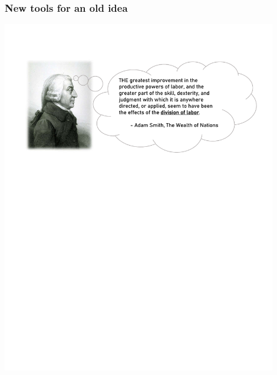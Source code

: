 \begin{frame}\frametitle{New tools for an old idea}

\vspace{0.3cm}
\centering
\includegraphics[width=0.90\textwidth]{material/crop-adam-smith.pdf}\\

\end{frame}


